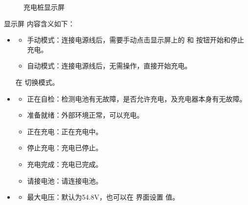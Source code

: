 \documentclass[a4paper,11pt,english,openany,oneside]{sphinxmanual}
\begin{document}
\begin{figure}[H]
\centering
\capstart

\noindent{}
\caption{充电桩显示屏}\label{\detokenize{_u9009_u914d_u8bbe_u5907:id32}}\end{figure}

\sphinxAtStartPar
显示屏  内容含义如下：
\begin{itemize}
\item {} 
\sphinxAtStartPar
{}
\begin{itemize}
\item {} 
\sphinxAtStartPar
手动模式：连接电源线后，需要手动点击显示屏上的  和  按钮开始和停止充电。

\item {} 
\sphinxAtStartPar
自动模式：连接电源线后，无需操作，直接开始充电。

\end{itemize}

\sphinxAtStartPar
在  切换模式。

\item {} 
\sphinxAtStartPar
{}
\begin{itemize}
\item {} 
\sphinxAtStartPar
正在自检：检测电池有无故障，是否允许充电，及充电器本身有无故障。

\item {} 
\sphinxAtStartPar
准备就绪：外部环境正常，可以充电。

\item {} 
\sphinxAtStartPar
正在充电：正在充电中。

\item {} 
\sphinxAtStartPar
停止充电：充电已停止。

\item {} 
\sphinxAtStartPar
充电完成：充电已完成。

\item {} 
\sphinxAtStartPar
请接电池：请连接电池。

\end{itemize}

\item {} 
\sphinxAtStartPar
{}
\begin{itemize}
\item {} 
\sphinxAtStartPar
最大电压：默认为54.8V，也可以在  界面设置  值。


\end{itemize}
\end{itemize}
\end{document}
